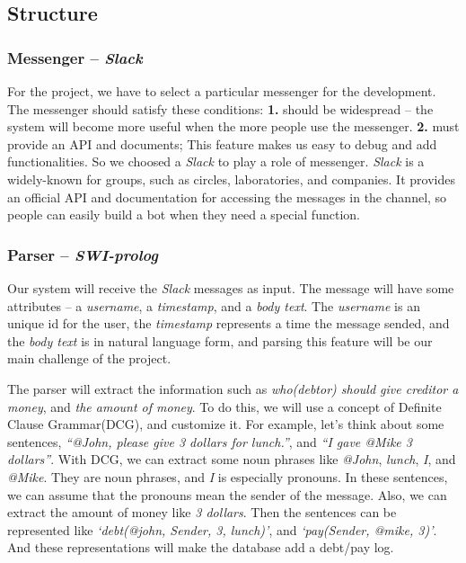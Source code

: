 \documentclass[11pt]{article}
\begin{document}
\subsection{Structure}

\subsubsection{Messenger -- \textit{Slack}}

For the project, we have to select a particular messenger for the development.
The messenger should satisfy these conditions:
\textbf{1.} should be widespread --
the system will become more useful when the more people use the messenger.
\textbf{2.} must provide an API and documents;
This feature makes us easy to debug and add functionalities.
So we choosed a \textit{Slack} to play a role of messenger.
\textit{Slack} is a widely-known for groups,
such as circles, laboratories, and companies.
It provides an official API and documentation
for accessing the messages in the channel,
so people can easily build a bot when they need a special function.

\subsubsection{Parser -- \textit{SWI-prolog}}
Our system will receive the \textit{Slack} messages as input.
The message will have some attributes -- a \textit{username}, a \textit{timestamp},
and a \textit{body text}.
The \textit{username} is an unique id for the user,
the \textit{timestamp} represents a time the message sended,
and the \textit{body text} is in natural language form,
and parsing this feature will be our main challenge of the project.

The parser will extract the information such as
\textit{who(debtor) should give creditor a money}, and \textit{the amount of money}.
To do this, we will use a concept of Definite Clause Grammar(DCG), and customize it.
For example, let's think about some sentences,
\textit{``@John, please give 3 dollars for lunch.''},
and \textit{``I gave @Mike 3 dollars''}.
With DCG, we can extract some noun phrases like
\textit{@John}, \textit{lunch}, \textit{I}, and \textit{@Mike}.
They are noun phrases, and \textit{I} is especially pronouns.
In these sentences, we can assume that the pronouns mean the sender of the message.
Also, we can extract the amount of money like \textit{3 dollars}.
Then the sentences can be represented like \textit{`debt(@john, Sender, 3, lunch)'},
and \textit{`pay(Sender, @mike, 3)'}. And these representations will
make the database add a debt/pay log.
\end{document}
